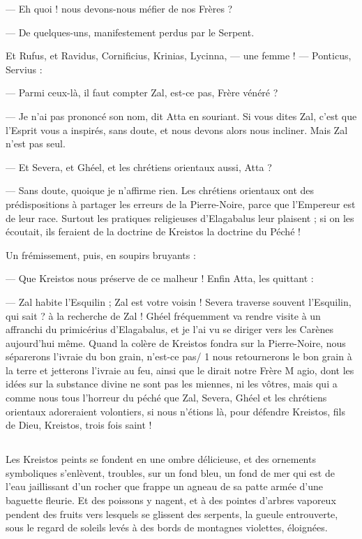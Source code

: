 \documentclass[a4paper, 11pt, oneside, polutonikogreek, french]{article}
\begin{document}
--- Eh quoi ! nous devons-nous méfier de nos Frères ?

--- De quelques-uns, manifestement perdus par le Serpent.

Et Rufus, et Ravidus, Cornificius, Krinias, Lycinna, --- une femme ! --- Ponticus, Servius :

--- Parmi ceux-là, il faut compter Zal, est-ce pas, Frère vénéré ?

--- Je n'ai pas prononcé son nom, dit Atta en souriant. Si vous dites Zal, c'est que l'Esprit vous a inspirés, sans doute, et nous devons alors nous incliner. Mais Zal n'est pas seul.

--- Et Severa, et Ghéel, et les chrétiens orientaux aussi, Atta ?

--- Sans doute, quoique je n'affirme rien. Les chrétiens orientaux ont des prédispositions à partager les erreurs de la Pierre-Noire, parce que l'Empereur est de leur race. Surtout les pratiques religieuses d'Elagabalus leur plaisent ; si on les écoutait, ils feraient de la doctrine de Kreistos la doctrine du Péché !

Un frémissement, puis, en soupirs bruyants :

--- Que Kreistos nous préserve de ce malheur ! Enfin Atta, les quittant :

--- Zal habite l'Esquilin ; Zal est votre voisin ! Severa traverse souvent l'Esquilin, qui sait ? à la recherche de Zal ! Ghéel fréquemment va rendre visite à un affranchi du primicérius d'Elagabalus, et je l'ai vu se diriger vers les Carènes aujourd'hui même. Quand la colère de Kreistos fondra sur la Pierre-Noire, nous séparerons l'ivraie du bon grain, n'est-ce pas/ 1 nous retournerons le bon grain à la terre et jetterons l'ivraie au feu, ainsi que le dirait notre Frère M agio, dont les idées sur la substance divine ne sont pas les miennes, ni les vôtres, mais qui a comme nous tous l'horreur du péché que Zal, Severa, Ghéel et les chrétiens orientaux adoreraient volontiers, si nous n'étions là, pour défendre Kreistos, fils de Dieu, Kreistos, trois fois saint !
\clearpage
\subsection{}
\paragraph{}
Les Kreistos peints se fondent en une ombre délicieuse, et des ornements symboliques s'enlèvent, troubles, sur un fond bleu, un fond de mer qui est de l'eau jaillissant d'un rocher que frappe un agneau de sa patte armée d'une baguette fleurie. Et des poissons y nagent, et à des pointes d'arbres vaporeux pendent des fruits vers lesquels se glissent des serpents, la gueule entrouverte, sous le regard de soleils levés à des bords de montagnes violettes, éloignées.
\end{document}
